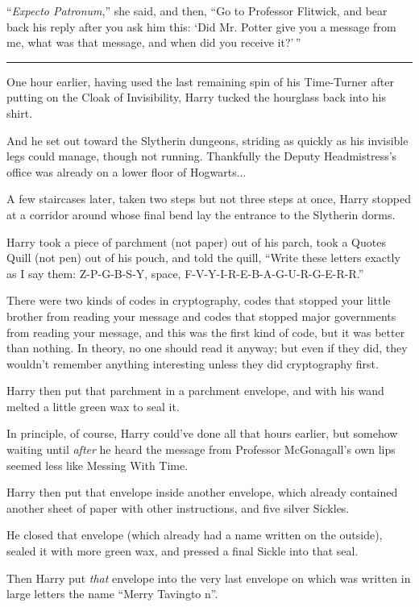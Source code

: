 ``\emph{Expecto Patronum},'' she said, and then, ``Go to Professor Flitwick, and bear back his reply after you ask him this: `Did Mr. Potter give you a message from me, what was that message, and when did you receive it?'\,''

\begin{center}\rule{3in}{0.4pt}\end{center}

One hour earlier, having used the last remaining spin of his Time-Turner after putting on the Cloak of Invisibility, Harry tucked the hourglass back into his shirt.

And he set out toward the Slytherin dungeons, striding as quickly as his invisible legs could manage, though not running. Thankfully the Deputy Headmistress's office was already on a lower floor of Hogwarts...

A few staircases later, taken two steps but not three steps at once, Harry stopped at a corridor around whose final bend lay the entrance to the Slytherin dorms.

Harry took a piece of parchment (not paper) out of his parch, took a Quotes Quill (not pen) out of his pouch, and told the quill, ``Write these letters exactly as I say them: Z-P-G-B-S-Y, space, F-V-Y-I-R-E-B-A-G-U-R-G-E-R-R.''

There were two kinds of codes in cryptography, codes that stopped your little brother from reading your message and codes that stopped major governments from reading your message, and this was the first kind of code, but it was better than nothing. In theory, no one should read it anyway; but even if they did, they wouldn't remember anything interesting unless they did cryptography first.

Harry then put that parchment in a parchment envelope, and with his wand melted a little green wax to seal it.

In principle, of course, Harry could've done all that hours earlier, but somehow waiting until \emph{after} he heard the message from Professor McGonagall's own lips seemed less like Messing With Time.

Harry then put that envelope inside another envelope, which already contained another sheet of paper with other instructions, and five silver Sickles.

He closed that envelope (which already had a name written on the outside), sealed it with more green wax, and pressed a final Sickle into that seal.

Then Harry put \emph{that} envelope into the very last envelope on which was written in large letters the name ``Merry Tavingto n''.

